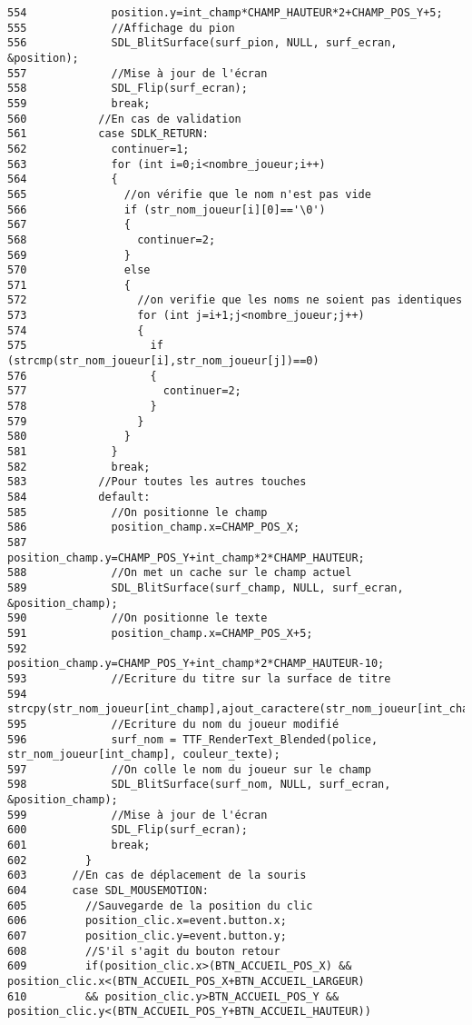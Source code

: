 \begin{Code}
\begin{verbatim}
554             position.y=int_champ*CHAMP_HAUTEUR*2+CHAMP_POS_Y+5;
555             //Affichage du pion
556             SDL_BlitSurface(surf_pion, NULL, surf_ecran, &position);
557             //Mise à jour de l'écran
558             SDL_Flip(surf_ecran);
559             break;
560           //En cas de validation
561           case SDLK_RETURN:
562             continuer=1;                  
563             for (int i=0;i<nombre_joueur;i++)
564             {
565               //on vérifie que le nom n'est pas vide
566               if (str_nom_joueur[i][0]=='\0')
567               {
568                 continuer=2;
569               }
570               else
571               {
572                 //on verifie que les noms ne soient pas identiques            
573                 for (int j=i+1;j<nombre_joueur;j++)
574                 {
575                   if (strcmp(str_nom_joueur[i],str_nom_joueur[j])==0)
576                   {
577                     continuer=2;
578                   }
579                 }
580               }
581             }
582             break;
583           //Pour toutes les autres touches
584           default:
585             //On positionne le champ
586             position_champ.x=CHAMP_POS_X;
587             position_champ.y=CHAMP_POS_Y+int_champ*2*CHAMP_HAUTEUR;
588             //On met un cache sur le champ actuel
589             SDL_BlitSurface(surf_champ, NULL, surf_ecran, &position_champ);
590             //On positionne le texte
591             position_champ.x=CHAMP_POS_X+5;
592             position_champ.y=CHAMP_POS_Y+int_champ*2*CHAMP_HAUTEUR-10;
593             //Ecriture du titre sur la surface de titre
594             strcpy(str_nom_joueur[int_champ],ajout_caractere(str_nom_joueur[int_champ],event.key.keysym.sym));
595             //Ecriture du nom du joueur modifié
596             surf_nom = TTF_RenderText_Blended(police, str_nom_joueur[int_champ], couleur_texte);
597             //On colle le nom du joueur sur le champ
598             SDL_BlitSurface(surf_nom, NULL, surf_ecran, &position_champ);
599             //Mise à jour de l'écran
600             SDL_Flip(surf_ecran);
601             break;
602         }
603       //En cas de déplacement de la souris
604       case SDL_MOUSEMOTION:
605         //Sauvegarde de la position du clic
606         position_clic.x=event.button.x;
607         position_clic.y=event.button.y;
608         //S'il s'agit du bouton retour
609         if(position_clic.x>(BTN_ACCUEIL_POS_X) && position_clic.x<(BTN_ACCUEIL_POS_X+BTN_ACCUEIL_LARGEUR)
610         && position_clic.y>BTN_ACCUEIL_POS_Y && position_clic.y<(BTN_ACCUEIL_POS_Y+BTN_ACCUEIL_HAUTEUR))

\end{verbatim}
\end{Code}
